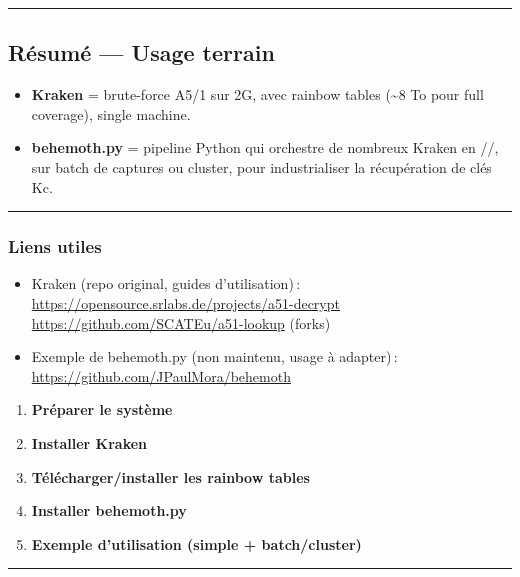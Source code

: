 \documentclass[
  french,
]{article}
\providecommand{\tightlist}{%
  \setlength{\itemsep}{0pt}\setlength{\parskip}{0pt}}
\begin{document}
\begin{center}\rule{0.5\linewidth}{0.5pt}\end{center}

\subsection{Résumé --- Usage terrain}\label{ruxe9sumuxe9-usage-terrain}

\begin{itemize}
\tightlist
\item
  \textbf{Kraken} = brute-force A5/1 sur 2G, avec rainbow tables
  (\textasciitilde8 To pour full coverage), single machine.
\item
  \textbf{behemoth.py} = pipeline Python qui orchestre de nombreux
  Kraken en //, sur batch de captures ou cluster, pour industrialiser la
  récupération de clés Kc.
\end{itemize}

\begin{center}\rule{0.5\linewidth}{0.5pt}\end{center}

\subsubsection{Liens utiles}\label{liens-utiles-3}

\begin{itemize}
\tightlist
\item
  Kraken (repo original, guides d'utilisation)\,:
  \url{https://opensource.srlabs.de/projects/a51-decrypt}
  \url{https://github.com/SCATEu/a51-lookup} (forks)
\item
  Exemple de behemoth.py (non maintenu, usage à adapter)\,:
  \url{https://github.com/JPaulMora/behemoth}
\end{itemize}

\begin{enumerate}
\def\labelenumi{\arabic{enumi}.}
\tightlist
\item
  \textbf{Préparer le système}
\item
  \textbf{Installer Kraken}
\item
  \textbf{Télécharger/installer les rainbow tables}
\item
  \textbf{Installer behemoth.py}
\item
  \textbf{Exemple d'utilisation (simple + batch/cluster)}
\end{enumerate}

\begin{center}\rule{0.5\linewidth}{0.5pt}\end{center}
\end{document}
